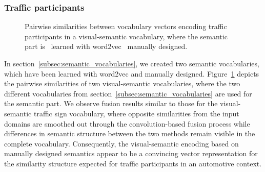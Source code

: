 \subsubsection{Traffic participants}%
\label{ssubsec:traffic_participants}

\begin{figure}[t]
    \centering
    \caption{Pairwise similarities between vocabulary vectors encoding traffic participants in a visual-semantic vocabulary, where the semantic part is~\protect{} learned with word2vec~\protect{} manually designed.}
    \label{fig:visual_semantic_vocab_traffic_participants_internal_similarities}
\end{figure}

In section~\ref{subsec:semantic_vocabularies}, we created two semantic vocabularies, which have been learned with word2vec and manually designed.
Figure~\ref{fig:visual_semantic_vocab_traffic_participants_internal_similarities} depicts the pairwise similarities of two visual-semantic vocabularies, where the two different vocabularies from section~\ref{subsec:semantic_vocabularies} are used for the semantic part.
We observe fusion results similar to those for the visual-semantic traffic sign vocabulary, where opposite similarities from the input domains are smoothed out through the convolution-based fusion process while differences in semantic structure between the two methods remain visible in the complete vocabulary.
Consequently, the visual-semantic encoding based on manually designed semantics appear to be a convincing vector representation for the similarity structure expected for traffic participants in an automotive context.

